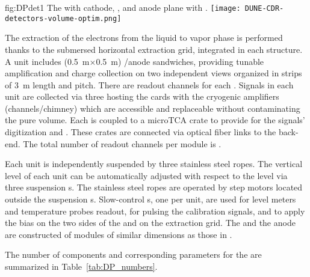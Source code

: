\begin{dunefigure}{fig:DPdet1}
  {The  with cathode, ,  and anode plane with .}
  \texttt{[image: DUNE-CDR-detectors-volume-optim.png]}
\end{dunefigure}

The extraction of the electrons from the liquid to vapor phase is performed thanks to the submersed horizontal extraction grid, integrated in each  structure. A  unit includes \dpswchpercrp (0.5~m$\times$0.5~m) /anode sandwiches, providing tunable amplification and charge collection on two independent views organized in strips of \SI{3}{m} length and \dpstrippitch pitch. There are \dpchpercrp readout channels for each . Signals in each  unit are collected via three  hosting the  cards with the cryogenic  amplifiers (\dpchperchimney channels/chimney) which are accessible and replaceable without contaminating the pure \lar volume. Each  is coupled to a microTCA crate to provide for the signals' digitization and  . These crates are connected  via optical fiber links to the  back-end. The total number of readout channels  per \nominalmodsize module is \dpnumcrpch.

Each  unit is independently suspended by three stainless steel ropes. The vertical level of each  unit can be automatically adjusted with respect to the \lar level via three suspension \fdth{}s. The stainless steel ropes are operated by step motors located outside the suspension \fdth{}s. Slow-control \fdth{}s,  one per  unit, are used for level meters and temperature probes readout,   for pulsing the calibration signals, and to apply the  bias on the two sides of the  and on the extraction grid. The  and the anode are constructed of modules of similar dimensions as those in .

The number of components and corresponding parameters for the \dpactivelarmass {} are summarized in Table~\ref{tab:DP_numbers}.

